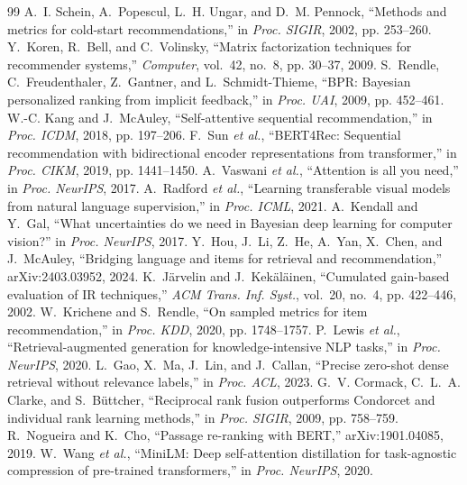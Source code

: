 \documentclass[conference,a4paper]{IEEEtran}
\begin{document}
\begin{thebibliography}{99}
 A.~I. Schein, A.~Popescul, L.~H. Ungar, and D.~M. Pennock, ``Methods and metrics for cold-start recommendations,'' in \emph{Proc. SIGIR}, 2002, pp. 253--260.
 Y.~Koren, R.~Bell, and C.~Volinsky, ``Matrix factorization techniques for recommender systems,'' \emph{Computer}, vol.~42, no.~8, pp. 30--37, 2009.
 S.~Rendle, C.~Freudenthaler, Z.~Gantner, and L.~Schmidt-Thieme, ``BPR: Bayesian personalized ranking from implicit feedback,'' in \emph{Proc. UAI}, 2009, pp. 452--461.
 W.-C. Kang and J.~McAuley, ``Self-attentive sequential recommendation,'' in \emph{Proc. ICDM}, 2018, pp. 197--206.
 F.~Sun \emph{et al.}, ``BERT4Rec: Sequential recommendation with bidirectional encoder representations from transformer,'' in \emph{Proc. CIKM}, 2019, pp. 1441--1450.
 A.~Vaswani \emph{et al.}, ``Attention is all you need,'' in \emph{Proc. NeurIPS}, 2017.
 A.~Radford \emph{et al.}, ``Learning transferable visual models from natural language supervision,'' in \emph{Proc. ICML}, 2021.
 A.~Kendall and Y.~Gal, ``What uncertainties do we need in Bayesian deep learning for computer vision?'' in \emph{Proc. NeurIPS}, 2017.
 Y.~Hou, J.~Li, Z.~He, A.~Yan, X.~Chen, and J.~McAuley, ``Bridging language and items for retrieval and recommendation,'' arXiv:2403.03952, 2024.
 K.~J\"arvelin and J.~Kek\"al\"ainen, ``Cumulated gain-based evaluation of IR techniques,'' \emph{ACM Trans. Inf. Syst.}, vol.~20, no.~4, pp. 422--446, 2002.
 W.~Krichene and S.~Rendle, ``On sampled metrics for item recommendation,'' in \emph{Proc. KDD}, 2020, pp. 1748--1757.
 P.~Lewis \emph{et al.}, ``Retrieval-augmented generation for knowledge-intensive NLP tasks,'' in \emph{Proc. NeurIPS}, 2020.
 L.~Gao, X.~Ma, J.~Lin, and J.~Callan, ``Precise zero-shot dense retrieval without relevance labels,'' in \emph{Proc. ACL}, 2023.
 G.~V. Cormack, C.~L.~A. Clarke, and S.~B\"uttcher, ``Reciprocal rank fusion outperforms Condorcet and individual rank learning methods,'' in \emph{Proc. SIGIR}, 2009, pp. 758--759.
 R.~Nogueira and K.~Cho, ``Passage re-ranking with BERT,'' arXiv:1901.04085, 2019.
 W.~Wang \emph{et al.}, ``MiniLM: Deep self-attention distillation for task-agnostic compression of pre-trained transformers,'' in \emph{Proc. NeurIPS}, 2020.

\end{thebibliography}
\end{document}
